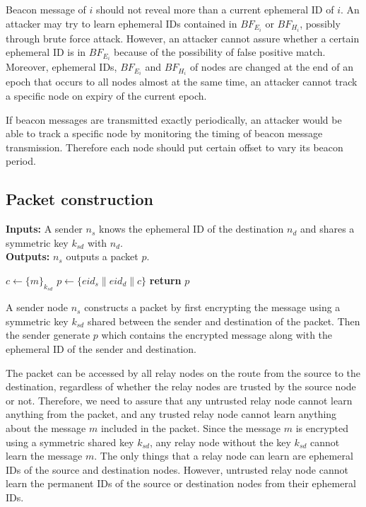 \documentclass[11pt]{article}
\begin{document}
Beacon message of $i$ should not reveal more than a current ephemeral ID of $i$. 
An attacker may try to learn ephemeral IDs contained in $BF_{E_i}$ or $BF_{H_i}$, possibly through brute force attack. 
However, an attacker cannot assure whether a certain ephemeral ID is in $BF_{E_i}$ because of the possibility of false positive match.  
Moreover, ephemeral IDs, $BF_{E_i}$ and $BF_{H_i}$ of nodes are changed at the end of an epoch that occurs to all nodes almost at the same time, an attacker cannot track a specific node on expiry of the current epoch. 

If beacon messages are transmitted exactly periodically, an attacker would be able to track a specific node by monitoring the timing of beacon message transmission. 
Therefore each node should put certain offset to vary its beacon period. 




\subsection{Packet construction}
\begin{framed}
\noindent
\textbf{Inputs:} A sender $n_s$ knows the ephemeral ID of the destination $n_d$ and shares a symmetric key $k_{sd}$ with $n_d$. \\

\noindent
\textbf{Outputs:} $n_s$ outputs a packet $p$. \\

\begin{algorithmic}[1]
    \State $c \leftarrow \{m\}_{k_{sd}}$
    \State $p \leftarrow \{eid_s \| eid_d \| c\}$
    \State \textbf{return} $p$
  \EndProcedure
\end{algorithmic}
\end{framed}

A sender node $n_s$ constructs a packet by first encrypting the message using a symmetric key $k_{sd}$ shared between the sender and destination of the packet.  
Then the sender generate $p$ which contains the encrypted message along with the ephemeral ID of the sender and destination. 

The packet can be accessed by all relay nodes on the route from the source to the destination, regardless of whether the relay nodes are trusted by the source node or not.
Therefore, we need to assure that any untrusted relay node cannot learn anything from the packet, and any trusted relay node cannot learn anything about the message $m$ included in the packet.
Since the message $m$ is encrypted using a symmetric shared key $k_{sd}$, any relay node without the key $k_{sd}$ cannot learn the message $m$.
The only things that a relay node can learn are ephemeral IDs of the source and destination nodes. 
However, untrusted relay node cannot learn the permanent IDs of the source or destination nodes from their ephemeral IDs. 
\end{document}
